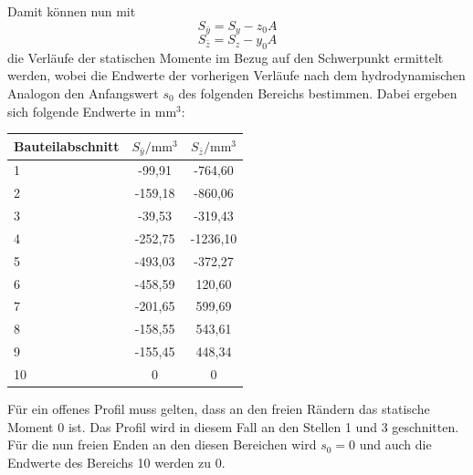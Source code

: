 Damit können nun mit
\begin{equation}
	S_{\bar{y}}=S_y-z_0A
\end{equation} 
\begin{equation}
S_{\bar{z}}=S_z-y_0A
\end{equation} 
die Verläufe der statischen Momente im Bezug auf den Schwerpunkt ermittelt werden, wobei die Endwerte der vorherigen Verläufe nach dem hydrodynamischen Analogon den Anfangswert $s_0$ des folgenden Bereichs bestimmen. Dabei ergeben sich folgende Endwerte in $\mathrm{mm}^3$:
\begin{center}
\begin{tabular}[h]{l|c|c}
Bauteilabschnitt&$S_{\bar{y}}/\mathrm{mm}^3$&$S_{\bar{z}}/\mathrm{mm}^3$\\
\hline
1&-99,91&-764,60\\
2&-159,18&-860,06\\
3&-39,53&-319,43\\
4&-252,75&-1236,10\\
5&-493,03&-372,27\\
6&-458,59&120,60\\
7&-201,65&599,69\\
8&-158,55&543,61\\
9&-155,45&448,34\\
10&0&0\\
\end{tabular}
\end{center}
Für ein offenes Profil muss gelten, dass an den freien Rändern das statische Moment $ 0 $ ist. Das Profil wird in diesem Fall an den Stellen 1 und 3 geschnitten. Für die nun freien Enden an den diesen Bereichen wird $s_0=0$ und auch die Endwerte des Bereichs 10 werden zu $0$.


